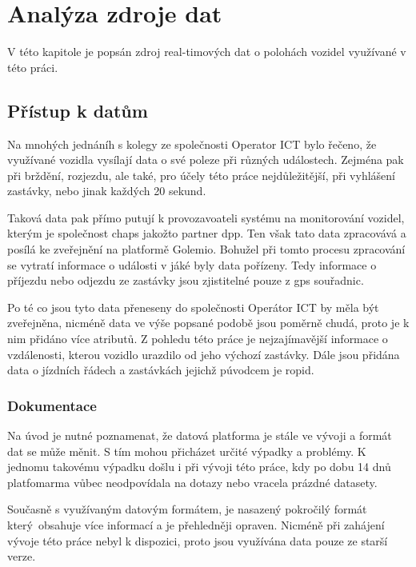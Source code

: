 \newcommand{\documentationAtt}[2] {#1 #2}

\chapter{Analýza zdroje dat}

V této kapitole je popsán zdroj real-timových dat o polohách vozidel využívané v této práci.

\section{Přístup k datům}

Na mnohých jednáníh s kolegy ze společnosti Operator ICT bylo řečeno, že využívané vozidla vysílají data o své poleze při různých událostech. Zejména pak při brždění, rozjezdu, ale také, pro účely této práce nejdůležitější, při vyhlášení zastávky, nebo jinak každých 20 sekund.

\bigbreak

Taková data pak přímo putují k provozavoateli systému na monitorování vozidel, kterým je společnost \gls{chaps} jakožto partner \gls{dpp}. Ten však tato data zpracovává a posílá ke zveřejnění na platformě Golemio. Bohužel při tomto procesu zpracování se vytratí informace o události v jáké byly data pořízeny. Tedy informace o příjezdu nebo odjezdu ze zastávky jsou zjistitelné pouze z \gls{gps} souřadnic.

\bigbreak

Po té co jsou tyto data přeneseny do společnosti Operátor ICT by měla být zveřejněna, nicméně data ve výše popsané podobě jsou poměrně chudá, proto je k nim přidáno více atributů. Z pohledu této práce je nejzajímavější informace o vzdálenosti, kterou vozidlo urazdilo od jeho výchozí zastávky. Dále jsou přidána data o jízdních řádech a zastávkách jejichž púvodcem je \gls{ropid}.

\subsection{Dokumentace}

Na úvod je nutné poznamenat, že datová platforma je stále ve vývoji a formát dat se může měnit. S tím mohou přicházet určité výpadky a problémy. K jednomu takovému výpadku došlu i při vývoji této práce, kdy po dobu 14 dnů platfomarma vůbec neodpovídala na dotazy nebo vracela prázdné datasety.

\bigbreak

Současně s využívaným datovým formátem, je nasazený pokročilý formát který obsahuje více informací a je přehledněji opraven. Nicméně při zahájení vývoje této práce nebyl k dispozici, proto jsou využívána data pouze ze starší verze.

